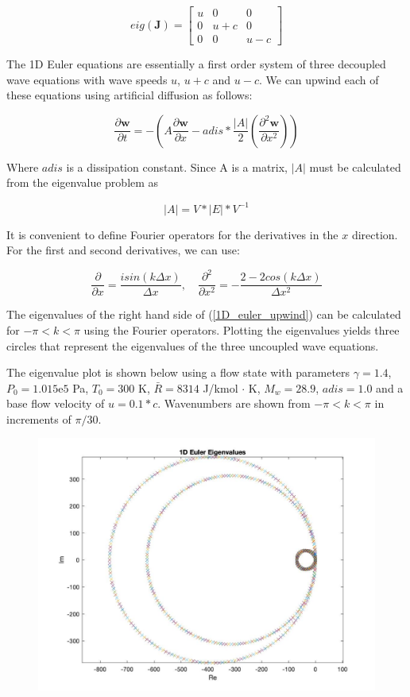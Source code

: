 \documentclass[10pt]{article}
\begin{document}
		$$eig(\mathbf{J}) = 
		\begin{bmatrix}
			u & 0 & 0 \\
			0 & u+c & 0 \\
			0 & 0 & u-c
		\end{bmatrix}$$

	The 1D Euler equations are essentially a first order system of three decoupled wave equations with wave speeds $u$, $u+c$ and $u-c$. We can upwind each of these equations using artificial diffusion as follows:
	
	\begin{equation} \label{1D_euler_upwind}
		\frac{\partial \mathbf{w}}{\partial t} = - \left( A \frac{\partial \mathbf{w}}{\partial x} - adis * \frac{|A|}{2} \left( \frac{\partial^2 \mathbf{w}}{\partial x^2} \right) \right)
	\end{equation}

	Where $adis$ is a dissipation constant. Since A is a matrix, $|A|$ must be calculated from the eigenvalue problem as
	
	\begin{equation}
		|A| = V*|E|*V^{-1}
	\end{equation}

	It is convenient to define Fourier operators for the derivatives in the $x$ direction. For the first and second derivatives, we can use:
	
	$$
	\frac{\partial}{\partial x} = \frac{i sin(k \Delta x)}{\Delta x}
	, \quad
	\frac{\partial^2}{\partial x^2} = - \frac{2-2cos(k \Delta x)}{\Delta x^2}
	$$
	
	The eigenvalues of the right hand side of (\ref{1D_euler_upwind}) can be calculated for $-\pi < k < \pi$ using the Fourier operators. Plotting the eigenvalues yields three circles that represent the eigenvalues of the three uncoupled wave equations.
	
	The eigenvalue plot is shown below using a flow state with parameters $\gamma = 1.4$, $P_0 = 1.015\mathrm{e}5$ Pa, $T_0 = 300$ K, $\bar{R} = 8314$ J/kmol $\cdot$ K, $M_w = 28.9$, $adis = 1.0$ and a base flow velocity of $u=0.1*c$. Wavenumbers are shown from $-\pi<k<\pi$ in increments of $\pi/30$.
	
	\begin{figure}[h]
		\includegraphics[width=12cm]{1D_euler_eig}
		\centering
	\end{figure}
	
\end{document}

